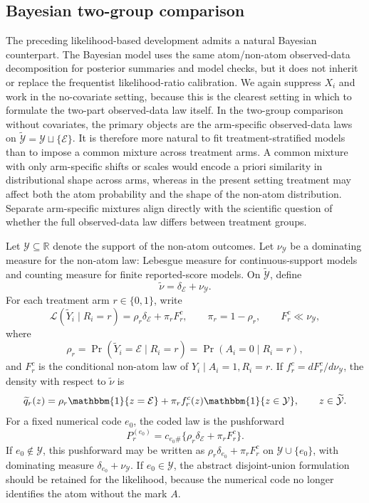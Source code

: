 \documentclass[11pt]{article}
\begin{document}
\subsection{Bayesian two-group comparison}\label{sec:bayesian-two-group}

The preceding likelihood-based development admits a natural Bayesian counterpart. The Bayesian model uses the same atom/non-atom observed-data decomposition for posterior summaries and model checks, but it does not inherit or replace the frequentist likelihood-ratio calibration. We again suppress $X_i$ and work in the no-covariate setting, because this is the clearest setting in which to formulate the two-part observed-data law itself. In the two-group comparison without covariates, the primary objects are the arm-specific observed-data laws on $\widetilde{\mathcal{Y}}=\mathcal{Y}\sqcup\{\mathcal{E}\}$. It is therefore more natural to fit treatment-stratified models than to impose a common mixture across treatment arms. A common mixture with only arm-specific shifts or scales would encode a priori similarity in distributional shape across arms, whereas in the present setting treatment may affect both the atom probability and the shape of the non-atom distribution. Separate arm-specific mixtures align directly with the scientific question of whether the full observed-data law differs between treatment groups.

Let $\mathcal{Y}\subseteq\mathbb{R}$ denote the support of the non-atom outcomes. Let $\nu_{\mathcal{Y}}$ be a dominating measure for the non-atom law: Lebesgue measure for continuous-support models and counting measure for finite reported-score models. On $\widetilde{\mathcal{Y}}$, define
\[
  \widetilde{\nu}=\delta_{\mathcal{E}}+\nu_{\mathcal{Y}}.
\]
For each treatment arm $r\in\{0,1\}$, write
\begin{equation*}
  \mathcal{L}(\widetilde{Y}_i \mid R_i = r)
  = \rho_r \delta_{\mathcal{E}} + \pi_r F_r^c,
  \qquad
  \pi_r = 1 - \rho_r,
  \qquad
  F_r^c \ll \nu_{\mathcal{Y}},
\end{equation*}
where
\[
  \rho_r=\Pr(\widetilde{Y}_i=\mathcal{E}\mid R_i=r)=\Pr(A_i=0\mid R_i=r),
\]
and $F_r^c$ is the conditional non-atom law of $Y_i\mid A_i=1,R_i=r$. If $f_r^c=dF_r^c/d\nu_{\mathcal{Y}}$, the density with respect to $\widetilde{\nu}$ is
\[
  \widetilde{q}_r(z)
  =\rho_r\mathbbm{1}\{z=\mathcal{E}\}
   +\pi_r f_r^c(z)\mathbbm{1}\{z\in\mathcal{Y}\},
  \qquad z\in\widetilde{\mathcal{Y}}.
\]
For a fixed numerical code $e_0$, the coded law is the pushforward
\[
  P_r^{(e_0)}=c_{e_0\#}\{\rho_r\delta_{\mathcal{E}}+\pi_rF_r^c\}.
\]
If $e_0\notin\mathcal{Y}$, this pushforward may be written as $\rho_r\delta_{e_0}+\pi_rF_r^c$ on $\mathcal{Y}\cup\{e_0\}$, with dominating measure $\delta_{e_0}+\nu_{\mathcal{Y}}$. If $e_0\in\mathcal{Y}$, the abstract disjoint-union formulation should be retained for the likelihood, because the numerical code no longer identifies the atom without the mark $A$.
\end{document}
